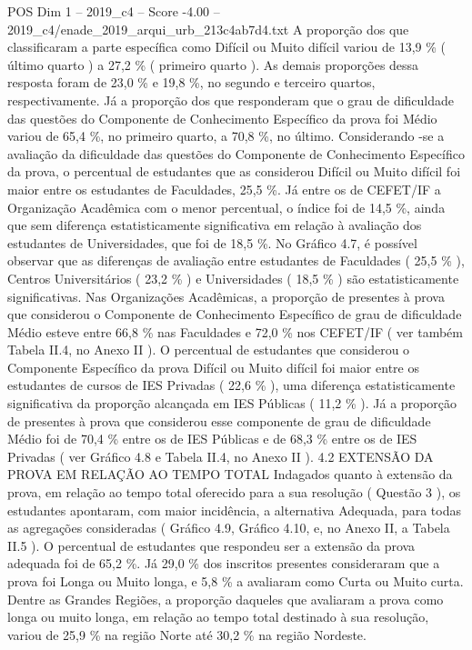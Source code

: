 \begin{textsample}{POS Dim 1 – 2019\_c4 – Score -4.00 – 2019\_c4/enade\_2019\_arqui\_urb\_213c4ab7d4.txt}
A proporção dos que classificaram a parte específica como Difícil ou Muito difícil variou de 13,9 \% ( último quarto ) a 27,2 \% ( primeiro quarto ).
As demais proporções dessa resposta foram de 23,0 \% e 19,8 \%, no segundo e terceiro quartos, respectivamente.
Já a proporção dos que responderam que o grau de dificuldade das questões do Componente de Conhecimento Específico da prova foi Médio variou de 65,4 \%, no primeiro quarto, a 70,8 \%, no último.
Considerando -se a avaliação da dificuldade das questões do Componente de Conhecimento Específico da prova, o percentual de estudantes que as considerou Difícil ou Muito difícil foi maior entre os estudantes de Faculdades, 25,5 \%.
Já entre os de CEFET/IF a Organização Acadêmica com o menor percentual, o índice foi de 14,5 \%, ainda que sem diferença estatisticamente significativa em relação à avaliação dos estudantes de Universidades, que foi de 18,5 \%.
No Gráfico 4.7, é possível observar que as diferenças de avaliação entre estudantes de Faculdades ( 25,5 \% ), Centros Universitários ( 23,2 \% ) e Universidades ( 18,5 \% ) são estatisticamente significativas.
Nas Organizações Acadêmicas, a proporção de presentes à prova que considerou o Componente de Conhecimento Específico de grau de dificuldade Médio esteve entre 66,8 \% nas Faculdades e 72,0 \% nos CEFET/IF ( ver também Tabela II.4, no Anexo II ).
O percentual de estudantes que considerou o Componente Específico da prova Difícil ou Muito difícil foi maior entre os estudantes de cursos de IES Privadas ( 22,6 \% ), uma diferença estatisticamente significativa da proporção alcançada em IES Públicas ( 11,2 \% ).
Já a proporção de presentes à prova que considerou esse componente de grau de dificuldade Médio foi de 70,4 \% entre os de IES Públicas e de 68,3 \% entre os de IES Privadas ( ver Gráfico 4.8 e Tabela II.4, no Anexo II ). 4.2 EXTENSÃO DA PROVA EM RELAÇÃO AO TEMPO TOTAL Indagados quanto à extensão da prova, em relação ao tempo total oferecido para a sua resolução ( Questão 3 ), os estudantes apontaram, com maior incidência, a alternativa Adequada, para todas as agregações consideradas ( Gráfico 4.9, Gráfico 4.10, e, no Anexo II, a Tabela II.5 ).
O percentual de estudantes que respondeu ser a extensão da prova adequada foi de 65,2 \%.
Já 29,0 \% dos inscritos presentes consideraram que a prova foi Longa ou Muito longa, e 5,8 \% a avaliaram como Curta ou Muito curta.
Dentre as Grandes Regiões, a proporção daqueles que avaliaram a prova como longa ou muito longa, em relação ao tempo total destinado à sua resolução, variou de 25,9 \% na região Norte até 30,2 \% na região Nordeste.

\end{textsample}

